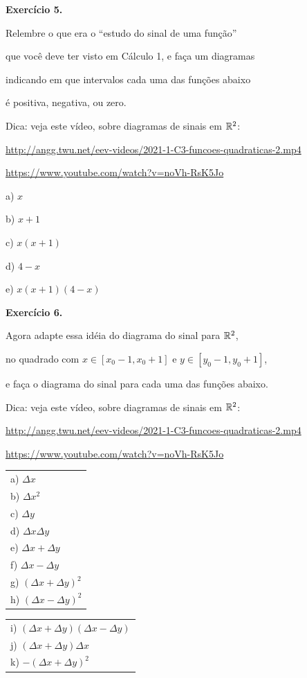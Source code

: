 \documentclass[oneside,12pt]{article}
\begin{document}
{\bf Exercício 5.}

Relembre o que era o ``estudo do sinal de uma função''

que você deve ter visto em Cálculo 1, e faça um diagramas

indicando em que intervalos cada uma das funções abaixo

é positiva, negativa, ou zero.

\ssk

Dica: veja este vídeo, sobre diagramas de sinais em $\mathbb{R}^2$:

\ssk

{\scriptsize

\url{http://angg.twu.net/eev-videos/2021-1-C3-funcoes-quadraticas-2.mp4}

\url{https://www.youtube.com/watch?v=noVh-RsK5Jo}

}

\msk

a) $x$

b) $x+1$

c) $x(x+1)$

d) $4-x$

e) $x(x+1)(4-x)$

\newpage


{\bf Exercício 6.}

Agora adapte essa idéia do diagrama do sinal para $\mathbb{R}^2$,

no quadrado com $x∈[x_0-1,x_0+1]$ e $y∈[y_0-1,y_0+1]$,

e faça o diagrama do sinal para cada uma das funções abaixo.

Dica: veja este vídeo, sobre diagramas de sinais em $\mathbb{R}^2$:

\ssk

{\scriptsize

\url{http://angg.twu.net/eev-videos/2021-1-C3-funcoes-quadraticas-2.mp4}

\url{https://www.youtube.com/watch?v=noVh-RsK5Jo}

}

\msk

\begin{tabular}[t]{l}
a) $Δx$   \\
b) $Δx^2$ \\
c) $Δy$   \\
d) $ΔxΔy$ \\
e) $Δx+Δy$ \\
f) $Δx-Δy$ \\
g) $(Δx+Δy)^2$ \\
h) $(Δx-Δy)^2$ \\
\end{tabular}
\quad
\begin{tabular}[t]{l}
i) $(Δx+Δy)(Δx-Δy)$ \\
j) $(Δx+Δy)Δx$ \\
k) $-(Δx+Δy)^2$ \\
\end{tabular}
\end{document}

